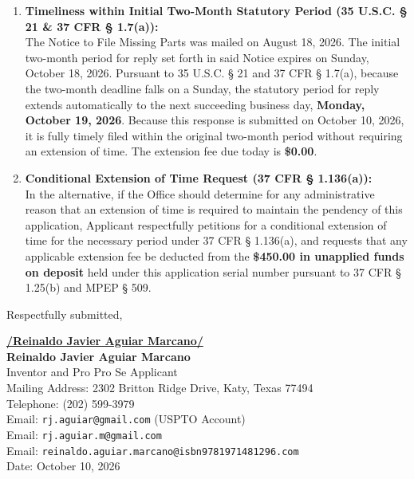 \documentclass[11pt,letterpaper]{article}
\begin{document}
\begin{enumerate}[leftmargin=*]
    \item \textbf{Timeliness within Initial Two-Month Statutory Period (35 U.S.C. \S{} 21 \& 37 CFR \S{} 1.7(a)):} \\
    The Notice to File Missing Parts was mailed on August 18, 2026. The initial two-month period for reply set forth in said Notice expires on Sunday, October 18, 2026. Pursuant to 35 U.S.C. \S{} 21 and 37 CFR \S{} 1.7(a), because the two-month deadline falls on a Sunday, the statutory period for reply extends automatically to the next succeeding business day, \textbf{Monday, October 19, 2026}. Because this response is submitted on October 10, 2026, it is fully timely filed within the original two-month period without requiring an extension of time. The extension fee due today is \textbf{\$0.00}.

    \item \textbf{Conditional Extension of Time Request (37 CFR \S{} 1.136(a)):} \\
    In the alternative, if the Office should determine for any administrative reason that an extension of time is required to maintain the pendency of this application, Applicant respectfully petitions for a conditional extension of time for the necessary period under 37 CFR \S{} 1.136(a), and requests that any applicable extension fee be deducted from the \textbf{\$450.00 in unapplied funds on deposit} held under this application serial number pursuant to 37 CFR \S{} 1.25(b) and MPEP \S{} 509.
\end{enumerate}

\vspace{0.6cm}
\begin{singlespace}
\noindent Respectfully submitted, \par\vspace{0.8cm}
\underline{\textbf{/Reinaldo Javier Aguiar Marcano/}} \\
\textbf{Reinaldo Javier Aguiar Marcano} \\
Inventor and Pro Pro Se Applicant \\
Mailing Address: 2302 Britton Ridge Drive, Katy, Texas 77494 \\
Telephone: (202) 599-3979 \\
Email: \texttt{rj.aguiar@gmail.com} (USPTO Account) \\
Email: \texttt{rj.aguiar.m@gmail.com} \\
Email: \texttt{reinaldo.aguiar.marcano@isbn9781971481296.com} \\
Date: October 10, 2026
\end{singlespace}
\end{document}
